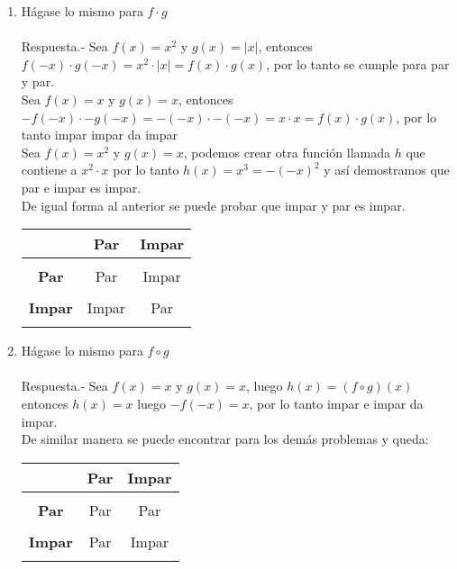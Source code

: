 \begin{enumerate}
\begin{enumerate}[\bfseries (a)]
	    \item Hágase lo mismo para $f\cdot g$\\\\
	    Respuesta.-\; Sea $f(x)=x^2$ \; y \; $g(x)=|x|$, entonces $f(-x) \cdot g(-x) = x^2 \cdot |x| = f(x) \cdot g(x)$, por lo tanto se cumple para par y par.\\
	    Sea $f(x)=x$ \; y \; $g(x)=x$, entonces $-f(-x) \cdot -g(-x) = -(-x) \cdot -(-x) = x \cdot x = f(x) \cdot g(x)$, por lo tanto impar impar da impar\\
	    Sea $f(x)=x^2$ \; y \; $g(x)=x$, podemos crear otra función llamada $h$ que contiene a $x^2 \cdot x$ por lo tanto $h(x)=x^3 = -(-x)^2$ y así demostramos que par e impar es impar.\\
	    De igual forma al anterior se puede probar que impar y par es impar.
	    \begin{center}
		\begin{tabular}{c|cc}
		    &\textbf{Par}&\textbf{Impar}\\
		    \hline\\
		    \textbf{Par}&Par&Impar\\\\
		    \textbf{Impar}&Impar&Par\\\\
		\end{tabular}
	    \end{center}
	    \vspace{1cm}

	    \item Hágase lo mismo para $f\circ g$\\\\
	    Respuesta.-\; Sea $f(x)=x$ \; y \; $g(x)=x$, luego $h(x)=(f \circ g)(x)$ entonces $h(x) = x$ luego $-f(-x) = x$, por lo tanto impar e impar da impar.\\
	    De similar manera se puede encontrar para los demás problemas y queda:
	    \begin{center}
		\begin{tabular}{c|cc}
		    &\textbf{Par}&\textbf{Impar}\\
		    \hline\\
		    \textbf{Par}&Par&Par\\\\
		    \textbf{Impar}&Par&Impar\\\\
		\end{tabular}
	    \end{center}
	    \vspace{1cm}


\end{enumerate}
\end{enumerate}
